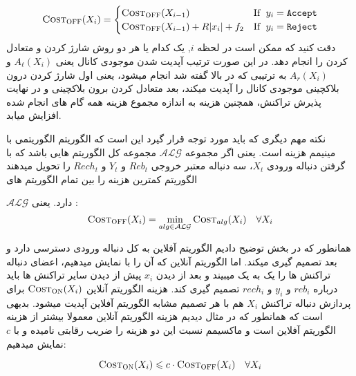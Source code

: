  \begin{equation}
\textsc{Cost}_{\textsc{OFF}}(X_{i}) =
    \begin{cases}
      \textsc{Cost}_{\textsc{OFF}}(X_{i-1}) & \text{If } \; y_i= \texttt{Accept}  \\
       \textsc{Cost}_{\textsc{OFF}}(X_{i-1}) + R|x_i| + f_2 & \text{If } \; y_i= \texttt{Reject}  \\
    \end{cases}       
\end{equation}
دقت کنید که ممکن است در لحظه $i$, 
\off
یک کدام یا هر دو روش شارژ کردن و متعادل کردن را انجام دهد. در این صورت ترتیب آپدیت شدن موجودی کانال یعنی  $A_{\ell}(X_i)$ و $A_{r}(X_i)$ به ترتیبی که در بالا گفته شد انجام میشود، یعنی اول شارژ کردن درون بلاکچینی موجودی کانال را آپدیت میکند، بعد متعادل کردن برون بلاکچینی و در نهایت پذیرش تراکنش، همچنین هزینه \off به اندازه مجموع هزینه همه گام های انجام شده افزایش میابد.
 
نکته مهم دیگری که باید مورد توجه قرار گیرد این است که الگوریتم \off الگوریتمی با مینیمم هزینه است. یعنی اگر مجموعه
$\mathcal{ALG}$
مجموعه کل الگوریتم هایی باشد که با گرفتن دنباله ورودی $X_t$، سه دنباله معتبر خروجی $Reb_t$ و  $Y_t$ و $Rech_t$ را تحویل میدهند الگوریتم \off کمترین هزینه را بین تمام الگوریتم های 

$\mathcal{ALG}$
دارد. یعنی :
$$\textsc{Cost}_{\textsc{OFF}}(X_i)= \min_{alg \in \mathcal{ALG}}{\textsc{Cost}_{alg}(X_i)} \quad \forall X_i$$

همانطور که در بخش  توضیح دادیم الگوریتم آفلاین به کل دنباله ورودی دسترسی دارد و بعد تصمیم گیری میکند. اما الگوریتم آنلاین که آن را با \on نمایش میدهیم، اعضای دنباله تراکنش ها را یک به یک میبیند و بعد از دیدن
$x_i$
پیش از دیدن سایر تراکنش ها باید درباره
$reb_i$ و  $y_i$ و $rech_i$
تصمیم گیری کند. 
هزینه الگوریتم آنلاین
$\textsc{Cost}_{\textsc{ON}}(X_i)$
برای پردازش دنباله تراکنش 
$X_i$
 هم با هر تصمیم مشابه الگوریتم آفلاین آپدیت میشود. بدیهی است که همانطور که در مثال  دیدیم هزینه الگوریتم آنلاین معمولا بیشتر از هزینه الگوریتم آفلاین است و ماکسیمم نسبت این دو هزینه را ضریب رقابتی نامیده و با $c$ نمایش میدهیم:

$$\textsc{Cost}_{\textsc{ON}}(X_i) \leqslant c \cdot \textsc{Cost}_{\textsc{OFF}}(X_i) \quad \forall X_i$$








